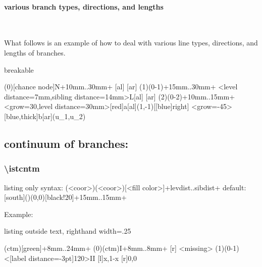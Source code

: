 
\paragraph{various branch types, directions, and lengths} ~

What follows is an example of how to deal with various line types, directions, and lengths of branches.

\begin{tcblisting}{breakable}
\begin{istgame}[>=stealth,shorten >=.8pt]
\istroot(0)[chance node]{N}+10mm..30mm+
  [al]
  [ar]
\endist
\istroot(1)(0-1)+15mm..30mm+
  \istb<level distance=7mm,sibling distance=14mm>{L}[al]
  [ar]
\endist
\istroot(2)(0-2)+10mm..15mm+
  \istb<grow=30,level distance=30mm>[red]{a}[al]{(1,-1)}[[blue]right]
  \istb*<grow=-45>[blue,thick]{b}[ar]{(u_{1},u_{2})}
\endist
\end{istgame}
\end{tcblisting}


\clearpage

\subsection{continuum of branches: \protect\cmd{\istcntm}}

\subsubsection*{\textbackslash istcntm}

\begin{tcblisting}{listing only}
syntax: (<coor>)(<coor>)[<fill color>]+levdist..sibdist+
default: [south]()(0,0)[black!20]+15mm..15mm+
\end{tcblisting}

Example:

\begin{tcblisting}{listing outside text, righthand width=.25\linewidth}
\begin{istgame}[scale=1.2]
\istcntm(ctm)[green]+8mm..24mm+
\istroot(0)(ctm){I}+8mm..8mm+
  [r]
  \istb<missing>
\endist
\xtdistance{10mm}{18mm}
\istroot(1)(0-1)<[label distance=-3pt]120>{II}
  [l]{x,1-x}
  [r]{0,0}
\endist
\end{istgame}
\end{tcblisting}

